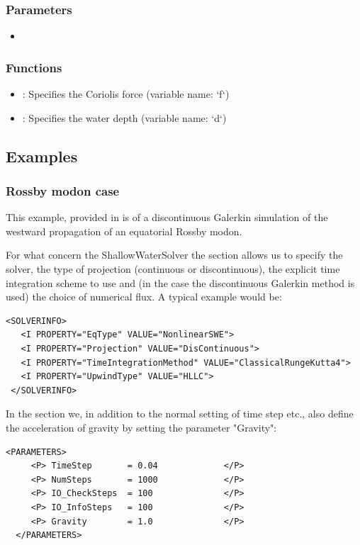 \subsubsection{Parameters}
\begin{itemize}
\item {}
\end{itemize}

\subsubsection{Functions}
\begin{itemize}
\item {}: Specifies the Coriolis force (variable name: `f`)
\item {}: Specifies the water depth (variable name: `d`)
\end{itemize}

\subsection{Examples}
\subsubsection{Rossby modon case}
This example, provided in  is of a
discontinuous Galerkin simulation of the westward propagation of an equatorial
Rossby modon.



For what concern the ShallowWaterSolver the
 section allows us to specify the solver, the type of
projection (continuous or discontinuous), the explicit time integration scheme to
use and (in the case the discontinuous Galerkin method is used) 
the choice of numerical flux. A typical example would be:
\begin{lstlisting}[style=XmlStyle]
 <SOLVERINFO>
   <I PROPERTY="EqType" VALUE="NonlinearSWE">
   <I PROPERTY="Projection" VALUE="DisContinuous">
   <I PROPERTY="TimeIntegrationMethod" VALUE="ClassicalRungeKutta4">
   <I PROPERTY="UpwindType" VALUE="HLLC">
 </SOLVERINFO>
\end{lstlisting}

In the  section we, in addition to the normal setting
of time step etc., also define the acceleration of gravity by 
setting the parameter "Gravity": 
\begin{lstlisting}[style=XmlStyle]
  <PARAMETERS>
     <P> TimeStep       = 0.04             </P>
     <P> NumSteps       = 1000             </P>
     <P> IO_CheckSteps  = 100              </P>
     <P> IO_InfoSteps   = 100              </P>
     <P> Gravity        = 1.0              </P>
  </PARAMETERS>
\end{lstlisting}


